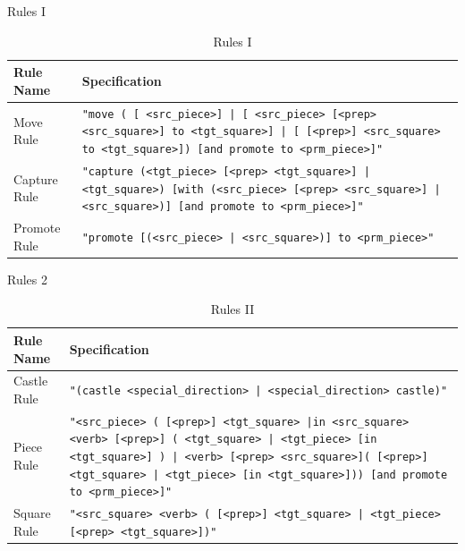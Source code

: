 \documentclass[english]{beamer}
\begin{document}
\begin{frame}{Rules I}
    \begin{table}[h]
        \centering
        \caption{Rules I}
        \small %
        \begin{tabularx}{1.0\textwidth}{|l|X|} %
            \hline
            \textbf{Rule Name} & \textbf{Specification} \\
            \hline
            Move Rule & \texttt{"move ( [ <src\_piece>] | [ <src\_piece> [<prep> <src\_square>] to <tgt\_square>] | [ [<prep>] <src\_square> to <tgt\_square>]) [and promote to <prm\_piece>]"} \\
            \hline
            Capture Rule & \texttt{"capture (<tgt\_piece> [<prep> <tgt\_square>] | <tgt\_square>) [with (<src\_piece> [<prep> <src\_square>] | <src\_square>)] [and promote to <prm\_piece>]"}\\
            \hline
            Promote Rule & \texttt{"promote [(<src\_piece> | <src\_square>)] to <prm\_piece>"} \\
            \hline 
        \end{tabularx}
        \label{tab:rules}
    \end{table}
\end{frame}


\begin{frame}{Rules 2}
    \begin{table}[h]
        \centering
        \caption{Rules II}
        \small %
        \begin{tabularx}{1.0\textwidth}{|l|X|} %
            \hline
            \textbf{Rule Name} & \textbf{Specification} \\
            \hline 
            Castle Rule & \texttt{"(castle <special\_direction> | <special\_direction> castle)"} \\
            \hline 
            Piece Rule & \texttt{"<src\_piece> ( [<prep>] <tgt\_square> |in <src\_square> <verb> [<prep>] ( <tgt\_square> | <tgt\_piece> [in <tgt\_square>] ) | <verb> [<prep> <src\_square>]( [<prep>] <tgt\_square> | <tgt\_piece>  [in <tgt\_square>])) [and promote to <prm\_piece>]"}\\
            \hline
            Square Rule & \texttt{"<src\_square> <verb> ( [<prep>] <tgt\_square> | <tgt\_piece> [<prep> <tgt\_square>])"}\\
            \hline
        \end{tabularx}
        \label{tab:rules}
    \end{table}
\end{frame}
\end{document}
